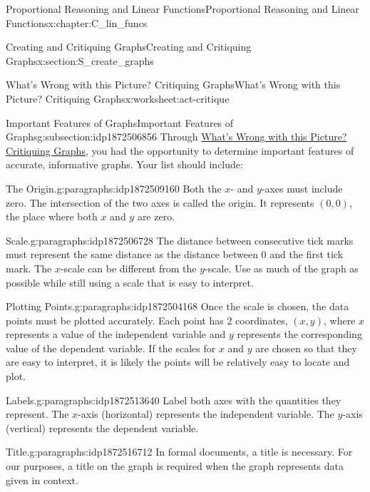 \documentclass[oneside,10pt,]{book}
\numberwithin{equation}{chapter}
\begin{document}
\begin{chapterptx}{Proportional Reasoning and Linear Functions}{}{Proportional Reasoning and Linear Functions}{}{}{x:chapter:C_lin_funcs}
\begin{sectionptx}{Creating and Critiquing Graphs}{}{Creating and Critiquing Graphs}{}{}{x:section:S_create_graphs}
\begin{worksheet-subsection}{What's Wrong with this Picture? Critiquing Graphs}{}{What's Wrong with this Picture? Critiquing Graphs}{}{}{x:worksheet:act-critique}
\begin{conclusion}{}
\begin{itemize}[label=\textbullet]
\end{itemize}
%
\end{conclusion}%
\end{worksheet-subsection}
\restoregeometry
%
%
\typeout{************************************************}
\typeout{************************************************}
%
\begin{subsectionptx}{Important Features of Graphs}{}{Important Features of Graphs}{}{}{g:subsection:idp1872506856}
Through \hyperref[x:worksheet:act-critique]{What's Wrong with this Picture? Critiquing Graphs}, you had the opportunity to determine important features of accurate, informative graphs. Your list should include:%
\begin{paragraphs}{The Origin.}{g:paragraphs:idp1872509160}%
Both the \(x\)- and \(y\)-axes must include zero. The intersection of the two axes is called the origin. It represents \((0, 0)\), the place where both \(x\) and \(y\) are zero.%
\end{paragraphs}%
\begin{paragraphs}{Scale.}{g:paragraphs:idp1872506728}%
The distance between consecutive tick marks must represent the same distance as the distance between 0 and the first tick mark. The \(x\)-scale can be different from the \(y\)-scale. Use as much of the graph as possible while still using a scale that is easy to interpret.%
\end{paragraphs}%
\begin{paragraphs}{Plotting Points.}{g:paragraphs:idp1872504168}%
Once the scale is chosen, the data points must be plotted accurately. Each point has 2 coordinates, \((x, y)\), where \(x\) represents a value of the independent variable and \(y\) represents the corresponding value of the dependent variable. If the scales for \(x\) and \(y\) are chosen so that they are easy to interpret, it is likely the points will be relatively easy to locate and plot.%
\end{paragraphs}%
\begin{paragraphs}{Labels.}{g:paragraphs:idp1872513640}%
Label both axes with the quantities they represent. The \(x\)-axis (horizontal) represents the independent variable. The \(y\)-axis (vertical) represents the dependent variable.%
\end{paragraphs}%
\begin{paragraphs}{Title.}{g:paragraphs:idp1872516712}%
In formal documents, a title is necessary. For our purposes, a title on the graph is required when the graph represents data given in context.%

\end{paragraphs}
\end{subsectionptx}
\end{sectionptx}
\end{chapterptx}
\end{document}

